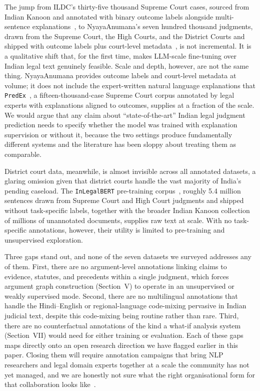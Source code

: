 The jump from ILDC's thirty-five thousand Supreme Court cases, sourced from Indian Kanoon and annotated with binary outcome labels alongside multi-sentence explanations~\cite{malik-etal-2021-ildc}, to NyayaAnumana's seven hundred thousand judgments, drawn from the Supreme Court, the High Courts, and the District Courts and shipped with outcome labels plus court-level metadata~\cite{nigam-etal-2025-nyayaanumana}, is not incremental. It is a qualitative shift that, for the first time, makes LLM-scale fine-tuning over Indian legal text genuinely feasible. Scale and depth, however, are not the same thing. NyayaAnumana provides outcome labels and court-level metadata at volume; it does not include the expert-written natural language explanations that \texttt{PredEx}~\cite{nigam-etal-2024-predex}, a fifteen-thousand-case Supreme Court corpus annotated by legal experts with explanations aligned to outcomes, supplies at a fraction of the scale. We would argue that any claim about ``state-of-the-art'' Indian legal judgment prediction needs to specify whether the model was trained with explanation supervision or without it, because the two settings produce fundamentally different systems and the literature has been sloppy about treating them as comparable.

District court data, meanwhile, is almost invisible across all annotated datasets, a glaring omission given that district courts handle the vast majority of India's pending caseload. The \texttt{InLegalBERT} pre-training corpus~\cite{paul-etal-2023-inlegalbert}, roughly 5.4 million sentences drawn from Supreme Court and High Court judgments and shipped without task-specific labels, together with the broader Indian Kanoon collection of millions of unannotated documents, supplies raw text at scale. With no task-specific annotations, however, their utility is limited to pre-training and unsupervised exploration.

Three gaps stand out, and none of the seven datasets we surveyed addresses any of them. First, there are no argument-level annotations linking claims to evidence, statutes, and precedents within a single judgment, which forces argument graph construction (Section~V) to operate in an unsupervised or weakly supervised mode. Second, there are no multilingual annotations that handle the Hindi--English or regional-language code-mixing pervasive in Indian judicial text, despite this code-mixing being routine rather than rare. Third, there are no counterfactual annotations of the kind a what-if analysis system (Section~VII) would need for either training or evaluation. Each of these gaps maps directly onto an open research direction we have flagged earlier in this paper. Closing them will require annotation campaigns that bring NLP researchers and legal domain experts together at a scale the community has not yet managed, and we are honestly not sure what the right organisational form for that collaboration looks like~\cite{modi-etal-2023-semeval}.

